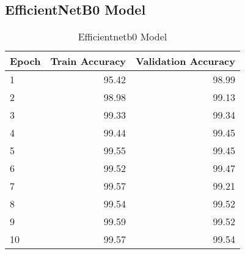 \documentclass[a4paper,11pt,titlepage]{jsarticle}
\begin{document}
\subsection{EfficientNetB0 Model}
\begin{table}[H]
\centering
\caption{Efficientnetb0 Model}
\label{tab:Efficientnetb0}
\begin{tabular}{lrr}
\hline
  Epoch &   Train Accuracy &   Validation Accuracy \\
\hline
      1 &             95.42 &                  98.99 \\
      2 &             98.98 &                  99.13 \\
      3 &             99.33 &                  99.34 \\
      4 &             99.44 &                  99.45 \\
      5 &             99.55 &                  99.45 \\
      6 &             99.52 &                  99.47 \\
      7 &             99.57 &                  99.21 \\
      8 &             99.54 &                  99.52 \\
      9 &             99.59 &                  99.52 \\
     10 &             99.57 &                  99.54 \\
\hline
\end{tabular}
\end{table}
\end{document}
